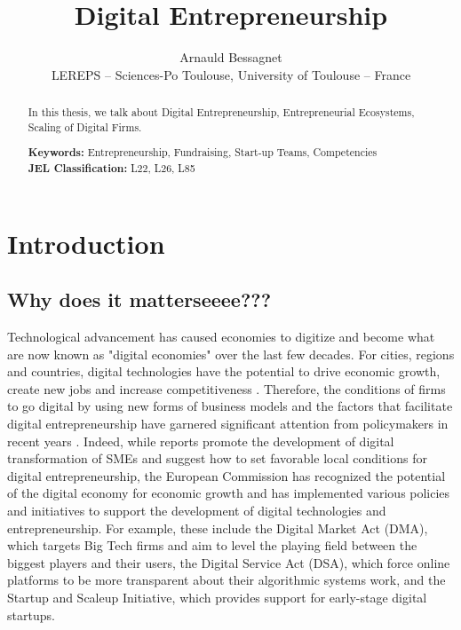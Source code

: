 \documentclass[12pt]{article}
\begin{document}
\title{Digital Entrepreneurship}
\date{\vspace{-3ex}}
\author{Arnauld Bessagnet \\ \footnotesize{LEREPS – Sciences-Po Toulouse, University of Toulouse – France} \\}

\maketitle \vspace{-1,5em}

\begin{abstract}
\noindent
In this thesis, we talk about Digital Entrepreneurship, Entrepreneurial Ecosystems, Scaling of Digital Firms.
\newline

\begin{obeylines}
\noindent \footnotesize{}{\textbf{Keywords:} Entrepreneurship, Fundraising, Start-up Teams, Competencies}
\noindent \footnotesize{\textbf{JEL Classification:} L22, L26, L85}
\end{obeylines}

\end{abstract}

\clearpage
\section{Introduction}

\subsection{Why does it matterseeee???}
Technological advancement has caused economies to digitize and become what are now known as "digital economies" over the last few decades. For cities, regions and countries, digital technologies have the potential to drive economic growth, create new jobs and increase competitiveness \citep{autio2016entrepreneurship}. Therefore, the conditions of firms to go digital by using new forms of business models and the factors that facilitate digital entrepreneurship have garnered significant attention from policymakers in recent years \citep{lisbon2016manifesto}. Indeed, while \citet{oecd2021digital, oecd2022scale} reports promote the development of digital transformation of SMEs and suggest how to set favorable local conditions for digital entrepreneurship, the European Commission has recognized the potential of the digital economy for economic growth and has implemented various policies and initiatives to support the development of digital technologies and entrepreneurship. For example, these include the Digital Market Act (DMA), which targets Big Tech firms and aim to level the playing field between the biggest players and their users, the Digital Service Act (DSA), which force online platforms to be more transparent about their algorithmic systems work, and the Startup and Scaleup Initiative, which provides support for early-stage digital startups.
\end{document}
